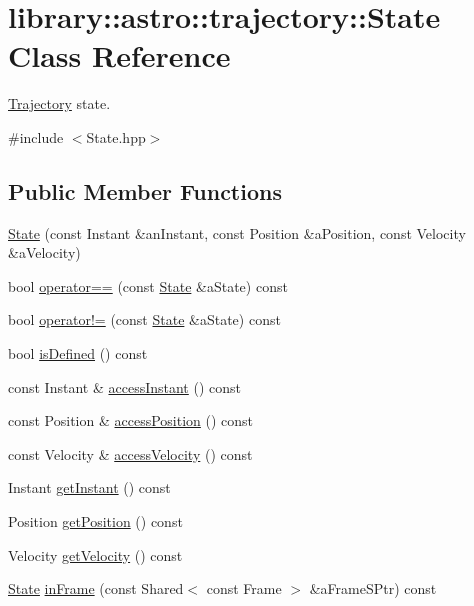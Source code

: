 \hypertarget{classlibrary_1_1astro_1_1trajectory_1_1_state}{}\section{library\+:\+:astro\+:\+:trajectory\+:\+:State Class Reference}
\label{classlibrary_1_1astro_1_1trajectory_1_1_state}


\hyperlink{classlibrary_1_1astro_1_1_trajectory}{Trajectory} state.  




{\ttfamily \#include $<$State.\+hpp$>$}

\subsection*{Public Member Functions}
\begin{DoxyCompactItemize}
\item 
\hyperlink{classlibrary_1_1astro_1_1trajectory_1_1_state_ada1cbf99efb7e85f0a1f9664868b20f5}{State} (const Instant \&an\+Instant, const Position \&a\+Position, const Velocity \&a\+Velocity)
\item 
bool \hyperlink{classlibrary_1_1astro_1_1trajectory_1_1_state_a3b5c3a4279b3c0659cdb8d26a2b4202c}{operator==} (const \hyperlink{classlibrary_1_1astro_1_1trajectory_1_1_state}{State} \&a\+State) const
\item 
bool \hyperlink{classlibrary_1_1astro_1_1trajectory_1_1_state_aa3ceea8c71e864839693a4aa7d3e93c2}{operator!=} (const \hyperlink{classlibrary_1_1astro_1_1trajectory_1_1_state}{State} \&a\+State) const
\item 
bool \hyperlink{classlibrary_1_1astro_1_1trajectory_1_1_state_a62bb004d41468603c0dc9b17d505158e}{is\+Defined} () const
\item 
const Instant \& \hyperlink{classlibrary_1_1astro_1_1trajectory_1_1_state_ae51674051753513c7657e154331be976}{access\+Instant} () const
\item 
const Position \& \hyperlink{classlibrary_1_1astro_1_1trajectory_1_1_state_ab0751200244a8b741fd67a1bfb47ad4d}{access\+Position} () const
\item 
const Velocity \& \hyperlink{classlibrary_1_1astro_1_1trajectory_1_1_state_ae81763c334c3bd69595917a94c60d9d5}{access\+Velocity} () const
\item 
Instant \hyperlink{classlibrary_1_1astro_1_1trajectory_1_1_state_a7c053801b20c9501156720253c6c1707}{get\+Instant} () const
\item 
Position \hyperlink{classlibrary_1_1astro_1_1trajectory_1_1_state_aa75125aa07bc506bfaca1e2fcfbab8a8}{get\+Position} () const
\item 
Velocity \hyperlink{classlibrary_1_1astro_1_1trajectory_1_1_state_a778acffd0f76d9409e8de7920893439a}{get\+Velocity} () const
\item 
\hyperlink{classlibrary_1_1astro_1_1trajectory_1_1_state}{State} \hyperlink{classlibrary_1_1astro_1_1trajectory_1_1_state_aeef0e18554b9b9ac67a15aed7c5e59fb}{in\+Frame} (const Shared$<$ const Frame $>$ \&a\+Frame\+S\+Ptr) const
\end{DoxyCompactItemize}
